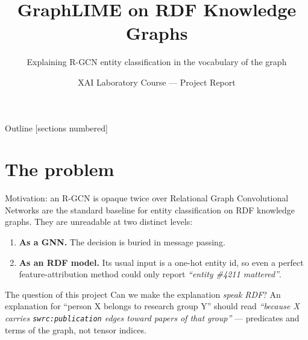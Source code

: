 \documentclass[10pt,aspectratio=169]{beamer}
\title{GraphLIME on RDF Knowledge Graphs}
\subtitle{Explaining R-GCN entity classification in the vocabulary of the graph}
\author{XAI Laboratory Course --- Project Report}
\date{}
\begin{document}
\maketitle

\begin{frame}{Outline}
  [sections numbered]
  \tableofcontents[hideallsubsections]
\end{frame}

\section{The problem}

\begin{frame}{Motivation: an R-GCN is opaque twice over}
  Relational Graph Convolutional Networks are the standard baseline for
  entity classification on RDF knowledge graphs. They are unreadable at two
  distinct levels:

  \begin{enumerate}
    \item \textbf{As a GNN.} The decision is buried in message passing.
    \item \textbf{As an RDF model.} Its usual input is a \alert{one-hot
      entity id}, so even a perfect feature-attribution method could only
      report \emph{``entity \#4211 mattered''}.
    \end{enumerate}

  \vfill
  \begin{block}{The question of this project}
    Can we make the explanation \emph{speak RDF}? An explanation for
    ``person X belongs to research group Y'' should read \emph{``because X
    carries \texttt{swrc:publication} edges toward papers of that group''}
    --- predicates and terms of the graph, not tensor indices.
  \end{block}
\end{frame}
\end{document}
